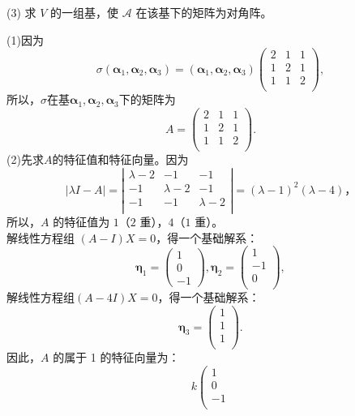 \begin{enumerate}[1~]
(3) 求 $V$ 的一组基，使 $\mathscr{A}$ 在该基下的矩阵为对角阵。
\begin{solution}
(1)因为
$$
\sigma (\boldsymbol{\alpha}_1, \boldsymbol{\alpha}_2, \boldsymbol{\alpha}_3) = (\boldsymbol{\alpha}_1, \boldsymbol{\alpha}_2, \boldsymbol{\alpha}_3) \left( \begin{matrix}
	2&		1&		1\\
	1&		2&		1\\
	1&		1&		2\\
\end{matrix} \right),
$$
所以，$\sigma$在基$\boldsymbol{\alpha}_1, \boldsymbol{\alpha}_2, \boldsymbol{\alpha}_3$下的矩阵为$$
A =  \left( \begin{matrix}
	2&		1&		1\\
	1&		2&		1\\
	1&		1&		2\\
\end{matrix} \right).$$
(2)先求$A$的特征值和特征向量。因为$$
|\lambda I- A| = \left| \begin{matrix}
	\lambda-2&		-1&		-1\\
	-1&		\lambda-2&		-1\\
	-1&		-1&		\lambda-2\\
\end{matrix} \right| = (\lambda - 1)^2(\lambda-4)，$$
所以，$A$ 的特征值为 $1$（$2$ 重），$4$（$1$ 重）。\\
解线性方程组 $(A-I)X = 0$，得一个基础解系：$$
\boldsymbol{\eta}_1 =\left( \begin{matrix}
	1  \\
	0  \\
	-1   \end{matrix} \right), \boldsymbol{\eta}_2 = \left( \begin{matrix}
	1  \\
	-1 \\
	0  \\ \end{matrix} \right), $$
解线性方程组$(A-4I)X = 0$，得一个基础解系：$$
\boldsymbol{\eta}_3 =\left( \begin{matrix}
   1  \\
	1  \\
	1  \\    \end{matrix} \right).$$
因此，$A$ 的属于 1 的特征向量为：$$
k\left( \begin{array}{c}
	1\\
	0\\
	-1\\

\end{array}$$
\end{solution}
\end{enumerate}
